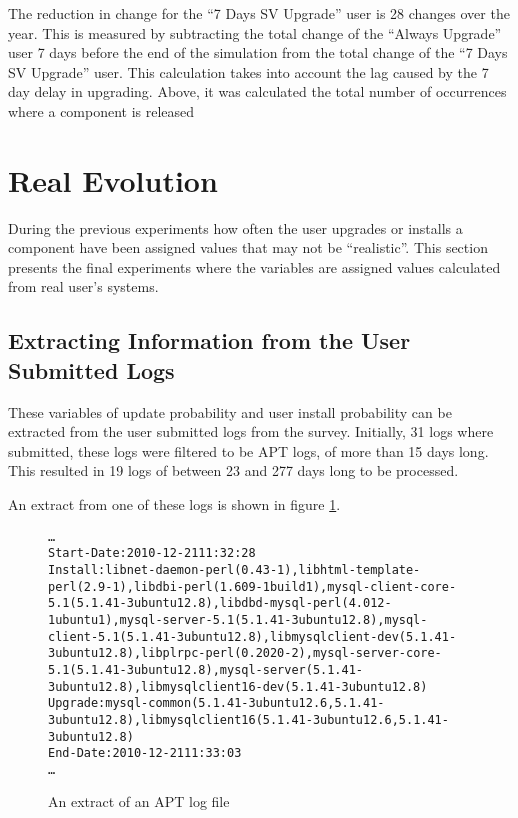 The reduction in change for the ``7 Days SV Upgrade'' user is 28 changes over the year.
This is measured by subtracting the total change of the ``Always Upgrade'' user 7 days before the end of the simulation
from the total change of the  ``7 Days SV Upgrade'' user.
This calculation takes into account the lag caused by the 7 day delay in upgrading.
Above, it was calculated the total number of occurrences where a component is released

\section{Real Evolution}
\label{exp.realuserssim}
During the previous experiments how often the user upgrades or installs a component have been assigned values that may not be ``realistic''.
This section presents the final experiments where the variables are assigned values calculated from real user's systems.


\subsection{Extracting Information from the User Submitted Logs}
These variables of update probability and user install probability can be extracted from the user submitted logs from the survey.
Initially, 31 logs where submitted, these logs were filtered to be APT logs, of more than 15 days long.
This resulted in 19 logs of between 23 and 277 days long to be processed.

An extract from one of these logs is shown in figure \ref{aptlog}.
\begin{figure}[htp]
\begin{center}
\begin{alltt}
\ldots
Start-Date: 2010-12-21 11:32:28
Install: libnet-daemon-perl (0.43-1), libhtml-template-perl (2.9-1), libdbi-perl (1.609-1build1), mysql-client-core-5.1 (5.1.41-3ubuntu12.8), libdbd-mysql-perl (4.012-1ubuntu1), mysql-server-5.1 (5.1.41-3ubuntu12.8), mysql-client-5.1 (5.1.41-3ubuntu12.8), libmysqlclient-dev (5.1.41-3ubuntu12.8), libplrpc-perl (0.2020-2), mysql-server-core-5.1 (5.1.41-3ubuntu12.8), mysql-server (5.1.41-3ubuntu12.8), libmysqlclient16-dev (5.1.41-3ubuntu12.8)
Upgrade: mysql-common (5.1.41-3ubuntu12.6, 5.1.41-3ubuntu12.8), libmysqlclient16 (5.1.41-3ubuntu12.6, 5.1.41-3ubuntu12.8)
End-Date: 2010-12-21 11:33:03
\ldots
\end{alltt}
\caption[APT log extract]{An extract of an APT log file}
\label{aptlog}
\end{center}
\end{figure}

